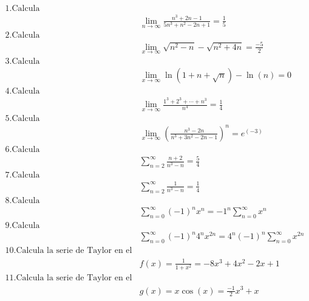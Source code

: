 \documentclass{article}
\begin{document}
\begin{align*}
\text{1.Calcula}\\
&\lim_{n \to \infty}\frac{n^3+2n-1}{5n^3+n^2-2n+1}=\frac{1}{5}\\
\text{2.Calcula}\\
&\lim_{x \to \infty}\sqrt{n^2-n}-\sqrt{n^2+4n}=\frac{-5}{2}\\
\text{3.Calcula}\\
&\lim_{x \to \infty}\ln(1+n+\sqrt{n})-\ln(n)=0\\
\text{4.Calcula}\\
&\lim_{x \to \infty}\frac{1^3+2^3+\cdots+n^3}{n^4}=\frac{1}{4} \\
\text{5.Calcula}\\
&\lim_{x \to \infty}{\left(\frac{n^3-2n}{n^3+3n^2-2n-1}\right)}^n=e^{(-3)}  \\
\text{6.Calcula}\\
&\sum_{n = 2}^{\infty}\frac{n+2}{n^3-n}=\frac{5}{4} \\
\text{7.Calcula}\\
&\sum_{n = 2}^{\infty}\frac{1}{n^3-n}=\frac{1}{4} \\
\text{8.Calcula}\\
&\sum_{n = 0}^{\infty}{(-1)}^n{x^n}={-1}^n\sum_{n = 0}^{\infty}x^{n}  \\
\text{9.Calcula}\\
&\sum_{n = 0}^{\infty}{(-1)}^n{4^n}{x^{2n}}=4^n{(-1)}^{n}\sum_{n = 0}^{\infty}x^{2n}  \\
\text{10.Calcula la serie de Taylor en el orígen de la funcion}\\
&f{(x)}=\frac{1}{1+x^2}=-8x^3+4x^2-2x+1\\
\text{11.Calcula la serie de Taylor en el orígen de la funcion}\\
&g{(x)}=x\cos(x)=\frac{-1}{2}x^3+x 
\end{align*}
\end{document}
